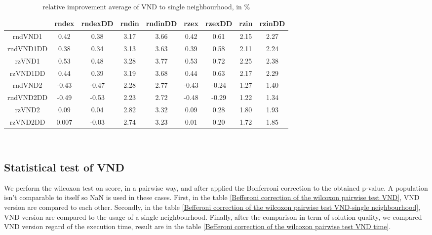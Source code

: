 \documentclass[12pt,a4paper]{article}
\begin{document}
~\\

\begin{table}[!h]
\centering
\begin{tabular}{|*{9}{c|}}
  \hline
   & rndex & rndexDD & rndin & rndinDD & rzex & rzexDD & rzin & rzinDD \\
  \hline
  rndVND1 & 0.42 & 0.38 & 3.17 & 3.66 & 0.42 & 0.61 & 2.15 & 2.27 \\
  rndVND1DD & 0.38 & 0.34 & 3.13 & 3.63 & 0.39 & 0.58 & 2.11 & 2.24 \\
  rzVND1 & 0.53 & 0.48 & 3.28 & 3.77 & 0.53 & 0.72 & 2.25 & 2.38 \\
  rzVND1DD & 0.44 & 0.39 & 3.19 & 3.68 & 0.44 & 0.63 & 2.17 & 2.29 \\
  rndVND2 & -0.43 & -0.47 & 2.28 & 2.77 & -0.43 & -0.24 & 1.27 & 1.40 \\
  rndVND2DD & -0.49 & -0.53 & 2.23 & 2.72 & -0.48 & -0.29 & 1.22 & 1.34 \\
  rzVND2 & 0.09 & 0.04 & 2.82 & 3.32 & 0.09 & 0.28 & 1.80 & 1.93 \\
  rzVND2DD & 0.007 & -0.03 & 2.74 & 3.23 & 0.01 & 0.20 & 1.72 & 1.85 \\
  \hline
\end{tabular}
\caption{relative improvement average of VND to single neighbourhood, in \%}
\label{relative improvement average of VND to single neighbourhood}
\end{table}

~\\

\subsection{Statistical test of VND}
 
We perform the wilcoxon test on score, in a pairwise way, and after applied the Bonferroni correction to the obtained p-value. A population isn't comparable to itself so NaN is used in these cases. First, in the table \ref{Befferoni correction of the wilcoxon pairwise test VND}, VND version are compared to each other. Secondly, in the table \ref{Befferoni correction of the wilcoxon pairwise test VND-single neighbourhood}, VND version are compared to the usage of a single neighbourhood. Finally, after the comparison in term of solution quality, we compared VND version regard of the execution time, result are in the table \ref{Befferoni correction of the wilcoxon pairwise test VND time}.
 
\end{document}
